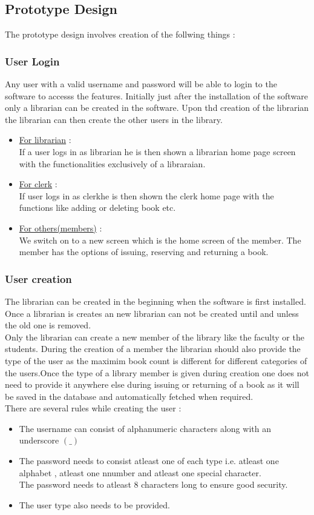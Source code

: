 \documentclass[a4paper]{article}
\begin{document}
\subsection{Prototype Design}
The prototype design involves creation of the follwing things :

\subsubsection*{User Login}
Any user with a valid username and password will be able to login to the software to accesss the features. Initially just after the installation of the software only a librarian can be created in the software. Upon thd creation of the librarian the librarian can then create the other users in the library.
\begin{itemize}
\item \underline{For librarian} :\\ If a user logs in as librarian he is then shown a librarian home page screen with the functionalities exclusively of a libraraian.
\item \underline{For clerk} :\\ If user logs in as clerkhe is then shown the clerk home page with the functions like adding or deleting book etc.
\item \underline{For others(members)} : \\We switch on to a new screen which is the home screen of the member. The member has the options of issuing, reserving and returning a book.
\end{itemize}

\subsubsection*{User creation}
The librarian can be created in the beginning when the software is first installed. Once a librarian is creates an new librarian can not be created until and unless the old one is removed.
\\
Only the librarian can create a new member of the library like the faculty or the students.
During the creation of a member the librarian should also provide the type of the user as the maximim book count is different for different categories of the users.Once the type of a library member is given during creation one does not need to provide it anywhere else during issuing or returning of a book as it will be saved in the database and automatically fetched when required.\\
There are several rules while creating the user :
\begin{itemize}
\item The username can consist of alphanumeric characters along with an underscore $(\_)$
\item The password needs to consist atleast one of each type i.e. atleast one alphabet , atleast one nnumber and atleast one special character.\\
The password needs to atleast 8 characters long to ensure good security.
\item The user type also needs to be provided.

\end{itemize}
\end{document}
